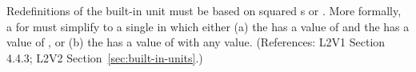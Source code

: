 Redefinitions of the built-in unit  must be based on squared
s or .  More formally, a \UnitDefinition
for  must simplify to a single \Unit in which either (a) the
  has a value of  and the 
 has a value of , or (b) the   has a value
of  with any  value.  (References:
L2V1 Section 4.4.3; L2V2 Section~\ref{sec:built-in-units}.)
